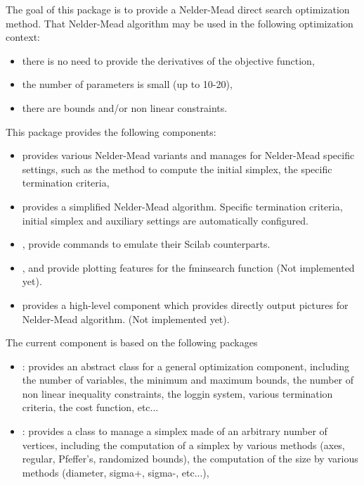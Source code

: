 %
\begin{Description}\relax
The goal of this package is to provide a Nelder-Mead direct search
optimization method. That Nelder-Mead algorithm may be used in the following
optimization context: \begin{itemize}

\item there is no need to provide the derivatives of the objective
function,
\item the number of parameters is small (up to 10-20),
\item there are bounds and/or non linear constraints.

\end{itemize}



This package provides the following components:\begin{itemize}

\item {} provides various Nelder-Mead variants and manages for
Nelder-Mead specific settings, such as the method to compute the initial
simplex, the specific termination criteria,
\item {} provides a simplified Nelder-Mead algorithm.
Specific termination criteria, initial simplex and auxiliary settings
are automatically configured.
\item {},  provide commands to emulate their
Scilab counterparts.
\item {},  and 
provide plotting features for the fminsearch function (Not implemented
yet).
\item {} provides a high-level component which provides directly
output pictures for Nelder-Mead algorithm. (Not implemented yet).

\end{itemize}

The current component is based on the following packages \begin{itemize}

\item {}: provides an abstract class for a general optimization
component, including the number of variables, the minimum and maximum
bounds, the number of non linear inequality constraints, the loggin
system, various termination criteria, the cost function, etc...
\item {}: provides a class to manage a simplex made of an
arbitrary number of vertices, including the computation of a simplex by
various methods (axes, regular, Pfeffer's, randomized bounds), the
computation of the size by various methods (diameter, sigma+, sigma-,
etc...),


\end{itemize}
\end{Description}
